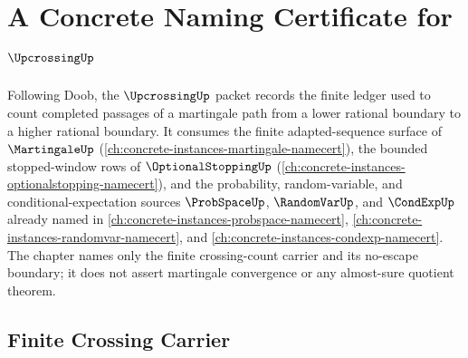 \chapter{A Concrete Naming Certificate for $\UpcrossingUp$}
\label{ch:concrete-instances-upcrossing-namecert}

Following Doob, the $\UpcrossingUp$ packet records the finite ledger used to count completed passages of a martingale path from a lower rational boundary to a higher rational boundary. It consumes the finite adapted-sequence surface of $\MartingaleUp$ (\autoref{ch:concrete-instances-martingale-namecert}), the bounded stopped-window rows of $\OptionalStoppingUp$ (\autoref{ch:concrete-instances-optionalstopping-namecert}), and the probability, random-variable, and conditional-expectation sources $\ProbSpaceUp$, $\RandomVarUp$, and $\CondExpUp$ already named in \autoref{ch:concrete-instances-probspace-namecert}, \autoref{ch:concrete-instances-randomvar-namecert}, and \autoref{ch:concrete-instances-condexp-namecert}. The chapter names only the finite crossing-count carrier and its no-escape boundary; it does not assert martingale convergence or any almost-sure quotient theorem.

\section{Finite Crossing Carrier}
\label{sec:upcrossing-carrier}


